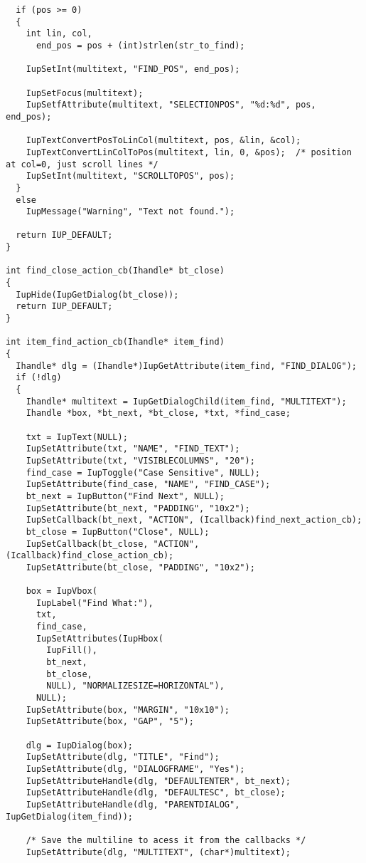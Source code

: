\documentclass{ctexart}
\begin{document}
\begin{lstlisting}
  if (pos >= 0)
  {
    int lin, col, 
      end_pos = pos + (int)strlen(str_to_find);

    IupSetInt(multitext, "FIND_POS", end_pos);

    IupSetFocus(multitext);
    IupSetfAttribute(multitext, "SELECTIONPOS", "%d:%d", pos, end_pos);

    IupTextConvertPosToLinCol(multitext, pos, &lin, &col);
    IupTextConvertLinColToPos(multitext, lin, 0, &pos);  /* position at col=0, just scroll lines */
    IupSetInt(multitext, "SCROLLTOPOS", pos);
  }
  else
    IupMessage("Warning", "Text not found.");

  return IUP_DEFAULT;
}

int find_close_action_cb(Ihandle* bt_close)
{
  IupHide(IupGetDialog(bt_close));
  return IUP_DEFAULT;
}

int item_find_action_cb(Ihandle* item_find)
{
  Ihandle* dlg = (Ihandle*)IupGetAttribute(item_find, "FIND_DIALOG");
  if (!dlg)
  {
    Ihandle* multitext = IupGetDialogChild(item_find, "MULTITEXT");
    Ihandle *box, *bt_next, *bt_close, *txt, *find_case;

    txt = IupText(NULL);
    IupSetAttribute(txt, "NAME", "FIND_TEXT");
    IupSetAttribute(txt, "VISIBLECOLUMNS", "20");
    find_case = IupToggle("Case Sensitive", NULL);
    IupSetAttribute(find_case, "NAME", "FIND_CASE");
    bt_next = IupButton("Find Next", NULL);
    IupSetAttribute(bt_next, "PADDING", "10x2");
    IupSetCallback(bt_next, "ACTION", (Icallback)find_next_action_cb);
    bt_close = IupButton("Close", NULL);
    IupSetCallback(bt_close, "ACTION", (Icallback)find_close_action_cb);
    IupSetAttribute(bt_close, "PADDING", "10x2");

    box = IupVbox(
      IupLabel("Find What:"),
      txt,
      find_case,
      IupSetAttributes(IupHbox(
        IupFill(),
        bt_next,
        bt_close,
        NULL), "NORMALIZESIZE=HORIZONTAL"),
      NULL);
    IupSetAttribute(box, "MARGIN", "10x10");
    IupSetAttribute(box, "GAP", "5");

    dlg = IupDialog(box);
    IupSetAttribute(dlg, "TITLE", "Find");
    IupSetAttribute(dlg, "DIALOGFRAME", "Yes");
    IupSetAttributeHandle(dlg, "DEFAULTENTER", bt_next);
    IupSetAttributeHandle(dlg, "DEFAULTESC", bt_close);
    IupSetAttributeHandle(dlg, "PARENTDIALOG", IupGetDialog(item_find));

    /* Save the multiline to acess it from the callbacks */
    IupSetAttribute(dlg, "MULTITEXT", (char*)multitext);


\end{lstlisting}
\end{document}
